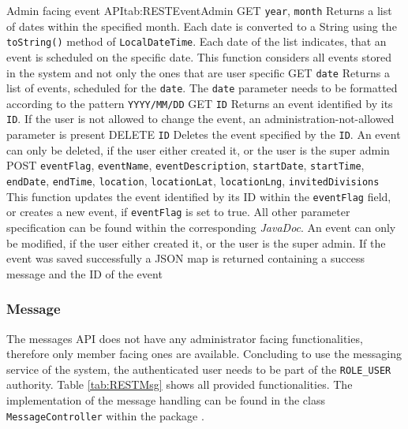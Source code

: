 \begin{RESTTable}{Admin facing event API}{tab:RESTEventAdmin}
		{GET}
		{\texttt{year}, \texttt{month}}
		{Returns a list of dates within the specified month. Each date is converted to a String using the \texttt{toString()} method of \texttt{LocalDateTime}. Each date of the list indicates, that an event is scheduled on the specific date. This function considers all events stored in the system and not only the ones that are user specific}
		{GET}
		{\texttt{date}}
		{Returns a list of events, scheduled for the \texttt{date}. The \texttt{date} parameter needs to be formatted according to the pattern \texttt{YYYY/MM/DD}}
		{GET}
		{\texttt{ID}}
		{Returns an event identified by its \texttt{ID}. If the user is not allowed to change the event, an administration-not-allowed parameter is present}
		{DELETE}
		{\texttt{ID}}
		{Deletes the event specified by the \texttt{ID}. An event can only be deleted, if the user either created it, or the user is the super admin}	
		{POST}
		{\texttt{eventFlag}, \texttt{eventName}, \texttt{eventDescription}, \texttt{startDate}, \texttt{startTime}, \texttt{endDate}, \texttt{endTime}, \texttt{location}, \texttt{locationLat}, \texttt{locationLng}, \texttt{invitedDivisions}}
		{This function updates the event identified by its ID within the \texttt{eventFlag} field, or creates a new event, if \texttt{eventFlag} is set to true. All other parameter specification can be found within the corresponding \emph{JavaDoc}. An event can only be modified, if the user either created it, or the user is the super admin. If the event was saved successfully a JSON map is returned containing a success message and the ID of the event}
\end{RESTTable}

\subsubsection{Message}

The messages \gls{API} does not have any administrator facing functionalities, therefore only member facing ones are available. Concluding to use the messaging service of the system, the authenticated user needs to be part of the \texttt{ROLE\_USER} authority. Table \vref{tab:RESTMsg} shows all provided functionalities. The implementation of the message handling can be found in the class \texttt{MessageController} within the package .


